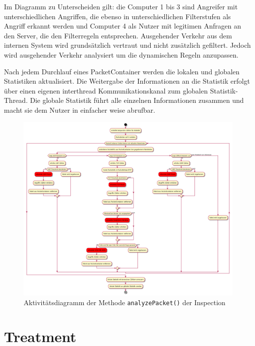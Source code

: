 \documentclass[../review_2.tex]{subfiles}
\begin{document}
Im Diagramm zu Unterscheiden gilt: die Computer 1 bis 3 sind Angreifer mit unterschiedlichen Angriffen, die ebenso in unterschiedlichen Filterstufen als Angriff erkannt werden und Computer 4 als Nutzer mit legitimen Anfragen an den Server, die den Filterregeln entsprechen.
Ausgehender Verkehr aus dem internen System wird grundsätzlich vertraut und nicht zusätzlich gefiltert. Jedoch wird ausgehender Verkehr analysiert um die dynamischen Regeln anzupassen.

Nach jedem Durchlauf eines PacketContainer werden die lokalen und globalen Statistiken aktualisiert. Die Weitergabe der Informationen an die Statistik erfolgt über einen eigenen interthread Kommunikationskanal zum globalen Statistik-Thread. Die globale Statistik führt alle einzelnen Informationen zusammen und macht sie dem Nutzer in einfacher weise abrufbar.

\begin{figure}[h]
    \centering
    \includegraphics[width=\linewidth]{img/inspection_ablauf.png}
    \caption{Aktivitätsdiagramm der Methode \texttt{analyzePacket()} der Inspection}
    \label{inspection_activity}
\end{figure}


\section{Treatment}
\end{document}
